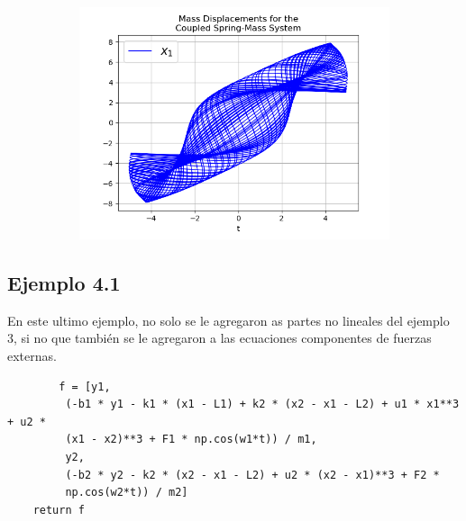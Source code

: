 \documentclass{article}
\begin{document}
\begin{figure}[h!]
\begin{subfigure}[b]{0.5\linewidth}
    \includegraphics[width=\linewidth]{two_springs333.png}
    \caption{}
  \end{subfigure}
\end{figure}

\subsection*{Ejemplo 4.1}

En este ultimo ejemplo, no solo se le agregaron as partes no lineales del ejemplo 3, si no que también se le agregaron a las ecuaciones componentes de fuerzas externas.

\begin{verbatim}
		f = [y1,
         (-b1 * y1 - k1 * (x1 - L1) + k2 * (x2 - x1 - L2) + u1 * x1**3 + u2 * 
         (x1 - x2)**3 + F1 * np.cos(w1*t)) / m1,
         y2,
         (-b2 * y2 - k2 * (x2 - x1 - L2) + u2 * (x2 - x1)**3 + F2 * 
         np.cos(w2*t)) / m2]
    return f
\end{verbatim}
\end{document}

